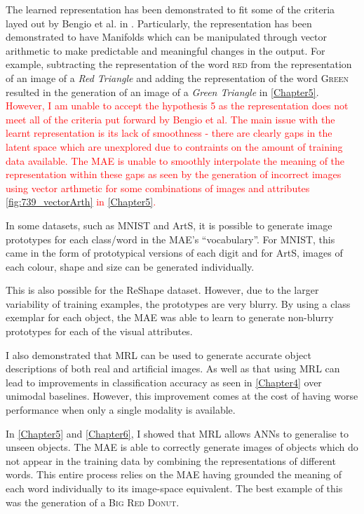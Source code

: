 The learned representation has been demonstrated to fit some of the criteria layed out by Bengio et al. in \cite{repRev}. Particularly, the representation has been demonstrated to have Manifolds which can be manipulated through vector arithmetic to make predictable and meaningful changes in the output. For example, subtracting the representation of the word \textsc{red} from the representation of an image of a \textit{Red Triangle} and adding the representation of the word \textsc{Green} resulted in the generation of an image of a \textit{Green Triangle} in \autoref{Chapter5}.  \textcolor{red}{However, I am unable to accept the hypothesis 5 as the representation does not meet all of the criteria put forward by Bengio et al. The main issue with the learnt representation is its lack of smoothness - there are clearly gaps in the latent space which are unexplored due to contraints on the amount of training data available. The \ac{MAE} is unable to smoothly interpolate the meaning of the representation within these gaps as seen by the generation of incorrect images using vector arthmetic for some combinations of images and attributes \autoref{fig:739_vectorArth} in \autoref{Chapter5}.}

In some datasets, such as MNIST and ArtS, it is possible to generate image prototypes for each class/word in the \ac{MAE}'s ``vocabulary''. For MNIST, this came in the form of prototypical versions of each digit and for ArtS, images of each colour, shape and size can be generated individually.

This is also possible for the ReShape dataset. However, due to the larger variability of training examples, the prototypes are very blurry. By using a class exemplar for each object, the \ac{MAE} was able to learn to generate non-blurry prototypes for each of the visual attributes.

I also demonstrated that \ac{MRL} can be used to generate accurate object descriptions of both real and artificial images. As well as that using \ac{MRL} can lead to improvements in classification accuracy as seen in \autoref{Chapter4} over unimodal baselines. However, this improvement comes at the cost of having worse performance when only a single modality is available.

In \autoref{Chapter5} and \autoref{Chapter6}, I showed that \ac{MRL} allows \acp{ANN} to generalise to unseen objects. The \ac{MAE} is able to correctly generate images of objects which do not appear in the training data by combining the representations of different words. This entire process relies on the \ac{MAE} having grounded the meaning of each word individually to its image-space equivalent. The best example of this was the generation of a \textsc{Big Red Donut}.


